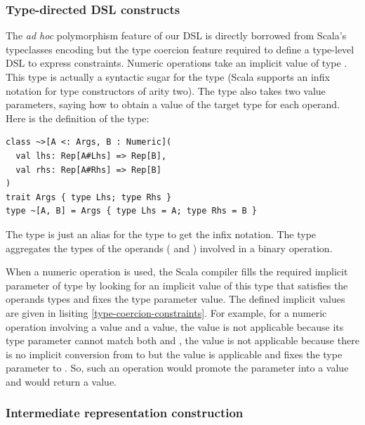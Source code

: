 \documentclass[american,english,runningheads]{llncs}
\begin{document}
\subsubsection{Type-directed DSL constructs}

The \emph{ad hoc} polymorphism feature of our DSL is directly borrowed from Scala’s typeclasses encoding but the type
coercion feature required to define a type-level DSL to express constraints. Numeric operations take an implicit
value of type . This type is actually a syntactic sugar for the type \code{\~>[\~[A, B], C]}
(Scala supports an infix notation for type constructors of arity two). The \code{\~\>} type also takes two value
parameters, saying how to obtain a value of the target type for each operand. Here is the definition of the
\code{\~\>} type:

\begin{lstlisting}
class ~>[A <: Args, B : Numeric](
  val lhs: Rep[A#Lhs] => Rep[B],
  val rhs: Rep[A#Rhs] => Rep[B]
)
trait Args { type Lhs; type Rhs }
type ~[A, B] = Args { type Lhs = A; type Rhs = B }
\end{lstlisting}

The \code{\~} type is just an alias for the  type to get the infix notation. The  type
aggregates the types of the operands ( and ) involved in a binary operation.

When a numeric operation is used, the Scala compiler fills the required implicit parameter of type
 by looking for an implicit value of this type that satisfies the operands types and fixes the
 type parameter value. The defined implicit values are given in lisiting \ref{type-coercion-constraints}.
For example, for a numeric operation involving a  value and a  value, the
 value is not applicable because its  type parameter cannot match both  and
, the  value is not applicable because there is no implicit conversion from
 to  but the  value is applicable and fixes the  type parameter to
. So, such an operation would promote the  parameter into a  value and
would return a  value.

\subsubsection{Intermediate representation construction}
\end{document}

